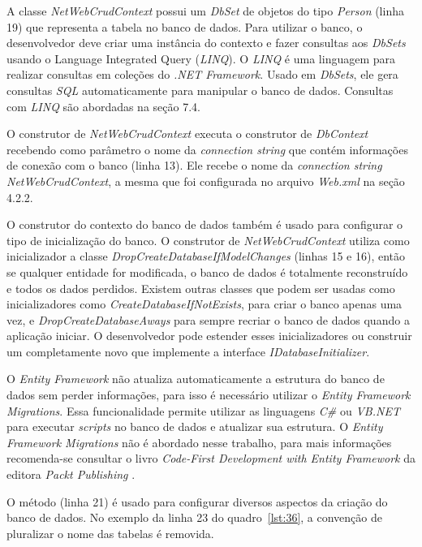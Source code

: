A classe \textit{NetWebCrudContext} possui um \textit{DbSet} de objetos do tipo \textit{Person} (linha 19) que representa a tabela no banco de dados. Para utilizar o banco, o desenvolvedor deve criar uma instância do contexto e fazer consultas aos \textit{DbSets} usando o Language Integrated Query (\textit{LINQ}). O \textit{LINQ} é uma linguagem para realizar consultas em coleções do \textit{.NET Framework}. Usado em \textit{DbSets}, ele gera consultas \textit{SQL} automaticamente para manipular o banco de dados. Consultas com \textit{LINQ} são abordadas na seção 7.4.

O construtor de \textit{NetWebCrudContext} executa o construtor de \textit{DbContext} recebendo como parâmetro o nome da \textit{connection string} que contém informações de conexão com o banco (linha 13). Ele recebe o nome da \textit{connection string} \textit{NetWebCrudContext}, a mesma que foi configurada no arquivo \textit{Web.xml} na seção 4.2.2.

O construtor do contexto do banco de dados também é usado para configurar o tipo de inicialização do banco. O construtor de \textit{NetWebCrudContext} utiliza como inicializador a classe \textit{DropCreateDatabaseIfModelChanges} (linhas 15 e 16), então se qualquer entidade for modificada, o banco de dados é totalmente reconstruído e todos os dados perdidos. Existem outras classes que podem ser usadas como inicializadores como \textit{CreateDatabaseIfNotExists}, para criar o banco apenas uma vez, e \textit{DropCreateDatabaseAways} para sempre recriar o banco de dados quando a aplicação iniciar. O desenvolvedor pode estender esses inicializadores ou construir um completamente novo que implemente a interface \textit{IDatabaseInitializer}.

O \textit{Entity Framework} não atualiza automaticamente a estrutura do banco de dados sem perder informações, para isso é necessário utilizar o \textit{Entity Framework Migrations}. Essa funcionalidade permite utilizar as linguagens \textit{C\#} ou \textit{VB.NET} para executar \textit{scripts} no banco de dados e atualizar sua estrutura. O \textit{Entity Framework Migrations} não é abordado nesse trabalho, para mais informações recomenda-se consultar o livro \textit{Code-First Development with Entity Framework} da editora \textit{Packt Publishing} \cite{27}.

O método  (linha 21) é usado para configurar diversos aspectos da criação do banco de dados.  No exemplo da linha 23 do quadro~\ref{lst:36}, a convenção de pluralizar o nome das tabelas é removida.

